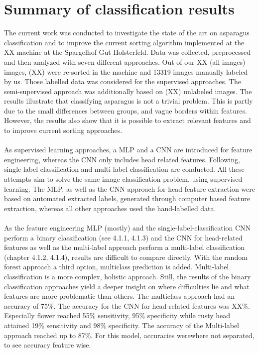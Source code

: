 \section{Summary of classification results}
\label{ch:Summary}

The current work was conducted to investigate the state of the art on asparagus classification and to improve the current sorting algorithm implemented at the XX machine at the Spargelhof Gut Holsterfeld. Data was collected, preprocessed and then analyzed with seven different approaches. Out of our XX (all images) images, (XX) were re-sorted in the machine and 13319 images manually labeled by us. Those labelled data was considered for the supervised approaches. The semi-supervised approach was additionally based on (XX) unlabeled images. The results illustrate that classifying asparagus is not a trivial problem. This is partly due to the small differences between groups, and vague borders within features. However, the results also show that it is possible to extract relevant features and to improve current sorting approaches. \\
\\
As supervised learning approaches, a MLP and a CNN are introduced for feature engineering, whereas the CNN only includes head related features. Following, single-label classification and multi-label classification are conducted. All these attempts aim to solve the same image classification problem, using supervised learning.
The MLP, as well as the CNN approach for head feature extraction were based on automated extracted labels, generated through computer based feature extraction, whereas all other approaches used the hand-labelled data. \\
\\
As the feature engineering MLP (mostly) and the single-label-classification CNN perform a binary classification (see 4.1.1, 4.1.3) and the CNN for head-related features as well as the multi-label approach perform a multi-label classification (chapter 4.1.2, 4.1.4), results are difficult to compare directly. With the random forest approach a third option, multiclass prediction is added. Multi-label classification is a more complex, holistic approach. Still, the results of the binary classification approaches yield a deeper insight on where difficulties lie and what features are more problematic than others.
The multiclass approach had an accuracy of 75\%. The accuracy for the CNN for head-related features was XX\%. Especially flower reached 55\% sensitivity, 95\% specificity while rusty head attained 19\% sensitivity and 98\% specificity. The accuracy of the Multi-label approach reached up to 87\%. For this model, accuracies werewhere not separated, to see accuracy feature wise. \\
